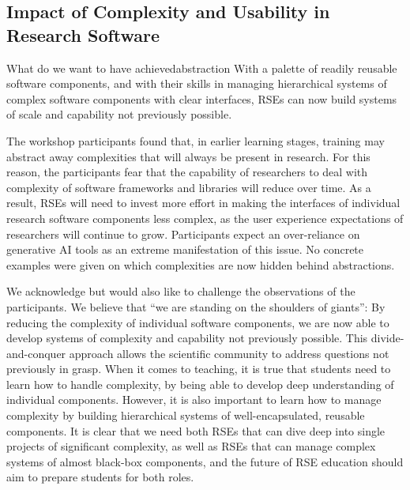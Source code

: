 \documentclass{eceasst}
\begin{document}
\subsection{Impact of Complexity and Usability in Research Software}
\begin{whatis}{What do we want to have achieved}{abstraction}
With a palette of readily reusable software components,
and with their skills in managing hierarchical systems of complex software components with clear interfaces,
RSEs can now build systems of scale and capability not previously possible.
\end{whatis}

The workshop participants found that, in earlier learning stages,
training may abstract away complexities that will always be present in research.
For this reason, the participants fear that the capability of researchers to deal with complexity
of software frameworks and libraries will reduce over time.
As a result, RSEs will need to invest more effort in making the interfaces of individual research software components
less complex, as the user experience expectations of researchers will continue to grow.
Participants expect an over-reliance on generative AI tools as an extreme manifestation of this issue.
No concrete examples were given on which complexities are now hidden behind abstractions.

We acknowledge but would also like to challenge the observations of the participants.
We believe that ``we are standing on the shoulders of giants'':
By reducing the complexity of individual software components,
we are now able to develop systems of complexity and capability not previously possible.
This divide-and-conquer approach allows the scientific community to address questions not previously in grasp.
When it comes to teaching, it is true that students need to learn how to handle complexity,
by being able to develop deep understanding of individual components.
However, it is also important to learn how to manage complexity
by building hierarchical systems of well-encapsulated, reusable components.
It is clear that we need both RSEs that can dive deep into single projects of significant complexity,
as well as RSEs that can manage complex systems of almost black-box components,
and the future of RSE education should aim to prepare students for both roles.
\end{document}
